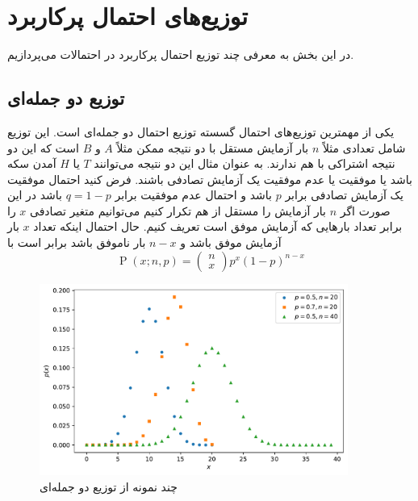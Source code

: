 \section{توزیع‌‌های احتمال پرکاربرد}
\label{ch1:sec8}
در این بخش به معرفی چند توزیع احتمال پرکاربرد در احتمالات می‌پردازیم.

\subsection{توزیع دو جمله‌ای}
یکی از مهمترین توزیع‌های احتمال‌ گسسته توزیع احتمال دو جمله‌ای است. این توزیع شامل تعدادی مثلاً $n$ بار آزمایش مستقل با دو نتیجه ممکن مثلاً $A$ و $B$ است که این دو نتیجه اشتراکی با هم ندارند. به عنوان مثال این دو نتیجه می‌توانند $T$ یا $H$ آمدن سکه باشد یا موفقیت یا عدم موفقیت یک آزمایش تصادفی باشند.
فرض کنید احتمال موفقیت یک آزمایش تصادفی برابر $p$ باشد و احتمال عدم موفقیت  برابر $q = 1-p$ باشد در این صورت اگر $n$ بار آزمایش را مستقل از هم تکرار کنیم می‌توانیم متغیر تصادفی $x$ را برابر تعداد بارهایی که آزمایش موفق است تعریف کنیم. حال احتمال اینکه تعداد $x$ بار آزمایش موفق باشد و $n-x$ بار ناموفق باشد برابر است با
\begin{equation}
    \operatorname{P}(x ; n, p) =\left( \begin{array}{l}{n} \\ {x}\end{array} \right) p^{x}(1-p)^{n-x}
    \end{equation}
\begin{figure}[htb]
    \centering
    \includegraphics[width=0.9\textwidth]{images/binomial.pdf}
    \caption{چند نمونه از توزیع دو جمله‌ای} %
    \par\medskip
\captionsetup{justification=centering}
\end{figure}
\FloatBarrier

